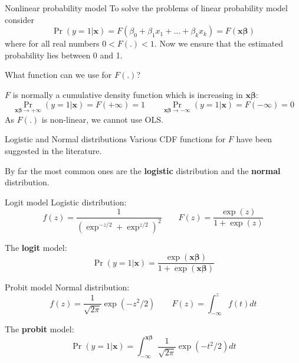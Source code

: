 \documentclass{beamer}
\begin{document}
\begin{frame}{Nonlinear probability model}
To solve the problems of linear probability model consider
\[\Pr(y=1|\mathbf{x})=F(\beta_0+\beta_1x_1+\dots+\beta_kx_k)=F(\mathbf{x\beta}) \]
where for all real numbers $0<F(.)<1$. Now we ensure that the estimated probability lies between 0 and 1.\bigskip

What function can we use for $F(.)$?\pause\medskip

$F$ is normally a cumulative density function which is increasing in $\mathbf{x\beta}$:
\[\Pr_{\mathbf{x\beta}\rightarrow+\infty}(y=1|\mathbf{x})=F(+\infty)=1\qquad \Pr_{\mathbf{x\beta}\rightarrow-\infty}(y=1|\mathbf{x})=F(-\infty)=0   \]
As $F(.)$ is non-linear, we cannot use OLS.

\end{frame}

\begin{frame}{Logistic and Normal distributions}
Various CDF functions for $F$ have been suggested in the literature. \medskip

By far the most common ones are the \textbf{logistic} distribution and the \textbf{normal} distribution.

\begin{center}
\end{center}

\end{frame}
\begin{frame}{Logit model}
Logistic distribution:
\[ f(z)=\frac{1}{(\exp^{-z/2}+\exp^{z/2})^2}\qquad F(z)=\frac{\exp(z)}{1+\exp(z)} \]\bigskip

The \textbf{logit} model:\[\Pr(y=1|\mathbf{x})=\frac{\exp(\mathbf{x\beta})}{1+\exp(\mathbf{x\beta})} \]
\end{frame}

\begin{frame}{Probit model}
Normal distribution:
\[f(z)=\frac{1}{\sqrt{2\pi}}\exp(-z^2/2)\qquad F(z)=\int_{-\infty}^{z}f(t)dt \]
\bigskip

The \textbf{probit} model:\[\Pr(y=1|\mathbf{x})=\int_{-\infty}^{\mathbf{x\beta}}\frac{1}{\sqrt{2\pi}}\exp(-t^2/2)dt \]

\end{frame}
\end{document}
